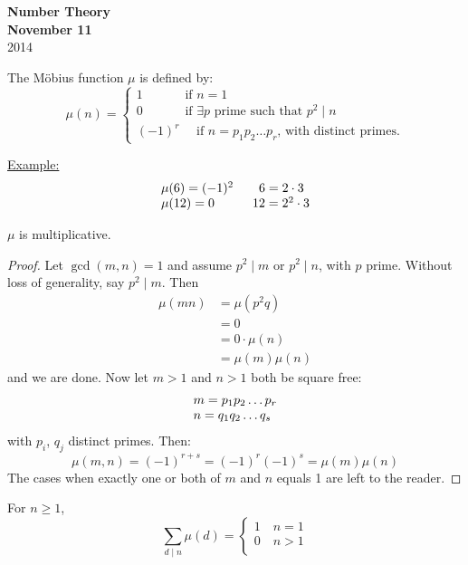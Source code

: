 \documentclass{report}
\begin{document}
{\centering
\Large
\textbf{Number Theory}\\
\normalsize
\textbf{November 11}\\
2014\\
}
\vspace{5mm}
\begin{defi} The M\"{o}bius function $\mu$ is defined by:
	\[ \mu(n)= 	\left \{
						\begin{array}{lcl}
							1 \quad \qquad\text{ if } n=1\\
							0 \quad \qquad \text{ if } \exists p \text{ prime such that } p^2 \mid n\\
							(-1)^r \quad \text{ if }n=p_1p_2 \dots p_r \text{,  with distinct primes.}
						\end{array}
						\right.
	\]
\end{defi}
\underline{Example:}\\
\[ \begin{array}{l c l}
			\mu(6)=(-1)^2 \qquad 6=2\cdot 3\\
			\mu(12)=0 \quad \qquad 12=2^2\cdot 3\\
		\end{array}
\]
\begin{thm}
		$\mu$ is multiplicative.
\end{thm}
\begin{proof}
				Let $\gcd(m,n)=1$ and assume $p^2 \mid m$ or $p^2\mid n$, with $p$ prime. Without loss of generality, say $p^2 \mid m$. Then \begin{equation*}
				\begin{aligned}
				\mu(mn) &=\mu(p^2q)\\
				&=0\\
				&=0\cdot \mu(n)\\
				&=\mu(m)\mu(n)
				\end{aligned}
				\end{equation*}
				and we are done.
				Now let $m>1$ and $n>1$ both be square free:
					\[\begin{array}{l c l}
						m=p_1p_2 \dots p_r\\
						n=q_1q_2 \dots q_s
						\end{array}
					\]
					with $p_i$, $q_j$ distinct primes.
				Then:
					\[
						\mu(m,n)=(-1)^{r+s}=(-1)^r(-1)^s=\mu(m) \mu(n)
					\]
				The cases when exactly one or both of $m$ and $n$ equals 1 are left to the reader.
\end{proof}
\begin{thm}
			For $n\geq1$,
				\[ \sum_{d \mid n} \mu(d) = \left \{
																		\begin{array}{lcl}
																			1 \quad n=1\\
																			0 \quad n>1\\
																		\end{array}
																		\right.
				\]
\end{thm}
\end{document}

